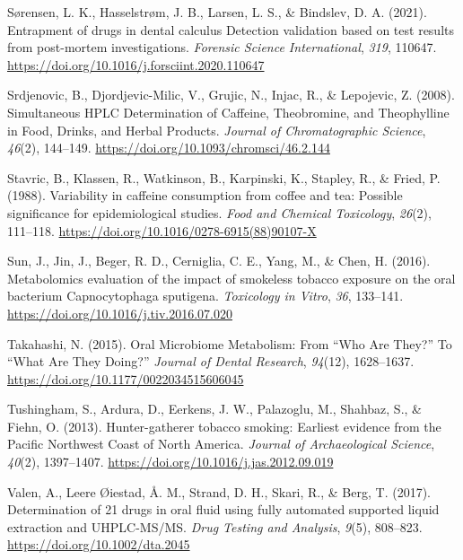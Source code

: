 \documentclass[
  b5paper,
]{book}
\newlength{\cslhangindent}
\newlength{\cslentryspacingunit} %
\newenvironment{CSLReferences}[2] %
 {%
  \setlength{\parindent}{0pt}
  \ifodd #1
  \let\oldpar\par
  \def\par{\hangindent=\cslhangindent\oldpar}
  \fi
  \setlength{\parskip}{#2\cslentryspacingunit}
 }%
 {}
\begin{document}
\begin{CSLReferences}{1}{0}
\leavevmode{}%
Sørensen, L. K., Hasselstrøm, J. B., Larsen, L. S., \& Bindslev, D. A.
(2021). Entrapment of drugs in dental calculus {\textendash} {Detection}
validation based on test results from post-mortem investigations.
\emph{Forensic Science International}, \emph{319}, 110647.
\url{https://doi.org/10.1016/j.forsciint.2020.110647}

\leavevmode{}%
Srdjenovic, B., Djordjevic-Milic, V., Grujic, N., Injac, R., \&
Lepojevic, Z. (2008). Simultaneous {HPLC Determination} of {Caffeine},
{Theobromine}, and {Theophylline} in {Food}, {Drinks}, and {Herbal
Products}. \emph{Journal of Chromatographic Science}, \emph{46}(2),
144--149. \url{https://doi.org/10.1093/chromsci/46.2.144}

\leavevmode{}%
Stavric, B., Klassen, R., Watkinson, B., Karpinski, K., Stapley, R., \&
Fried, P. (1988). Variability in caffeine consumption from coffee and
tea: {Possible} significance for epidemiological studies. \emph{Food and
Chemical Toxicology}, \emph{26}(2), 111--118.
\url{https://doi.org/10.1016/0278-6915(88)90107-X}

\leavevmode{}%
Sun, J., Jin, J., Beger, R. D., Cerniglia, C. E., Yang, M., \& Chen, H.
(2016). Metabolomics evaluation of the impact of smokeless tobacco
exposure on the oral bacterium {Capnocytophaga} sputigena.
\emph{Toxicology in Vitro}, \emph{36}, 133--141.
\url{https://doi.org/10.1016/j.tiv.2016.07.020}

\leavevmode{}%
Takahashi, N. (2015). Oral {Microbiome Metabolism}: {From} {``{Who Are
They}?''} To {``{What Are They Doing}?''} \emph{Journal of Dental
Research}, \emph{94}(12), 1628--1637.
\url{https://doi.org/10.1177/0022034515606045}

\leavevmode{}%
Tushingham, S., Ardura, D., Eerkens, J. W., Palazoglu, M., Shahbaz, S.,
\& Fiehn, O. (2013). Hunter-gatherer tobacco smoking: Earliest evidence
from the {Pacific Northwest Coast} of {North America}. \emph{Journal of
Archaeological Science}, \emph{40}(2), 1397--1407.
\url{https://doi.org/10.1016/j.jas.2012.09.019}

\leavevmode{}%
Valen, A., Leere Øiestad, Å. M., Strand, D. H., Skari, R., \& Berg, T.
(2017). Determination of 21 drugs in oral fluid using fully automated
supported liquid extraction and {UHPLC-MS}/{MS}. \emph{Drug Testing and
Analysis}, \emph{9}(5), 808--823. \url{https://doi.org/10.1002/dta.2045}


\end{CSLReferences}
\end{document}
